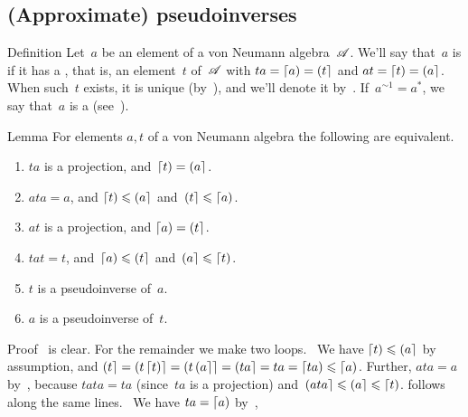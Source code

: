 \documentclass[a]{subfiles}
\begin{document}
\subsection{(Approximate) pseudoinverses}
\begin{parsec}%
\begin{point}{Definition}%
Let~$a$ be an element of a von Neumann algebra~$\mathscr{A}$.
We'll say that~$a$ is 
if it has a ,
that is,
an element~$t$ of~$\mathscr{A}$
with 
$ta=\left\lceil a\right)=\left(t\right\rceil$
and $at=\left\lceil t\right)=\left(a\right\rceil$.
When such~$t$ exists,
it is unique (by~),
and we'll denote it by~.
If~$a^{\sim1}=a^*$,
we say that~$a$ is a 
(see~).
\end{point}
\begin{point}{Lemma}%
For elements $a,t$ of a von Neumann algebra
the following are equivalent.
\begin{enumerate}
\item
\label{pseudoinverse-1}
$ta$ is a projection, and~$\left\lceil t\right)=\left(a\right\rceil$.
\item
\label{pseudoinverse-2}
$ata=a$, and $\left\lceil t\right)\leqslant \left(a\right\rceil$ and~$\left(t\right\rceil\leqslant \left\lceil a\right)$.
\item
\label{pseudoinverse-3}
$at$ is a projection, and $\left\lceil a\right)=\left(t\right\rceil$.
\item
\label{pseudoinverse-4}
$tat=t$, and~$\left\lceil a\right)\leqslant \left(t\right\rceil$ and~$\left(a\right\rceil\leqslant \left\lceil t\right)$.
\item
\label{pseudoinverse-5}
$t$ is a pseudoinverse of~$a$.
\item
\label{pseudoinverse-6}
$a$ is a pseudoinverse of~$t$.
\end{enumerate}
\begin{point}{Proof}%
\grayed{(\ref{pseudoinverse-5}$\iff$%
\ref{pseudoinverse-6})}\ 
is clear.
For the remainder we  make two loops.
\grayed{(\ref{pseudoinverse-1}$\Longrightarrow$\ref{pseudoinverse-2})}\ 
We have $\left\lceil t\right)\leqslant \left(a\right\rceil$ by assumption,
and $\left(t\right\rceil=\left(t\left\lceil t\right)\right\rceil
=\left(t\left(a\right\rceil\right\rceil
=\left(ta\right\rceil=ta=\left\lceil ta\right)\leqslant\left\lceil a\right)$.
Further, $ata=a$
by~,
because $tata=ta$ (since~$ta$ is a projection)
and~$\left(ata\right\rceil\leqslant \left(a\right\rceil\leqslant\left\lceil t\right)$.
\grayed{(\ref{pseudoinverse-3}$\Longrightarrow$\ref{pseudoinverse-4})} 
follows along the same lines.
\grayed{(\ref{pseudoinverse-2}$
	\Longrightarrow$%
\ref{pseudoinverse-5})}\ 
We have $ta=\left\lceil a\right)$ by~,

\end{point}
\end{point}
\end{parsec}
\end{document}
